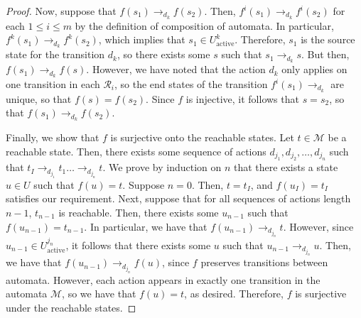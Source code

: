 \documentclass[11pt]{article}
\begin{document}
\begin{proof}
    Now, suppose that $f(s_1) \to_{d_k} f(s_2)$.
    Then, $f^{i}(s_1) \to_{d_k} f^{i}(s_2)$ for each $1 \leq i \leq m$ by the definition of composition of automata.
    In particular, $f^{k}(s_1) \to_{d_k} f^{k}(s_2)$, which implies that $s_1 \in U^{k}_{\text{active}}$.
    Therefore, $s_1$ is the source state for the transition $d_k$, so there exists some $s$ such that $s_1 \to_{d_k} s$.
    But then, $f(s_1) \to_{d_k} f(s)$.
    However, we have noted that the action $d_k$ only applies on one transition in each $\mathcal{R}_{i}$, so the end states of the transition $f^{i}(s_1) \to_{d_k}$ are unique, so that $f(s) = f(s_2)$.
    Since $f$ is injective, it follows that $s = s_2$, so that $f(s_1) \to_{d_k} f(s_2)$.

    Finally, we show that $f$ is surjective onto the reachable states.
    Let $t \in \mathcal{M}$ be a reachable state.
    Then, there exists some sequence of actions $d_{j_1}, d_{j_2}, \ldots, d_{j_n}$ such that $t_I \to_{d_{j_1}} t_1 \ldots \to_{d_{j_n}} t$.
    We prove by induction on $n$ that there exists a state $u \in U$ such that $f(u) = t$.
    Suppose $n = 0$.
    Then, $t = t_I$, and $f(u_I) = t_I$ satisfies our requirement.
    Next, suppose that for all sequences of actions length $n-1$, $t_{n-1}$ is reachable.
    Then, there exists some $u_{n-1}$ such that $f(u_{n-1}) = t_{n-1}$.
    In particular, we have that $f(u_{n-1}) \to_{d_{j_n}} t$.
    However, since $u_{n-1} \in U_{\text{active}}^{j_n}$, it follows that there exists some $u$ such that $u_{n-1} \to_{d_{j_n}} u$.
    Then, we have that $f(u_{n-1}) \to_{d_{j_n}} f(u)$, since $f$ preserves transitions between automata.
    However, each action appears in exactly one transition in the automata $\mathcal{M}$, so we have that $f(u) = t$, as desired.
    Therefore, $f$ is surjective under the reachable states.
\end{proof}
\end{document}

